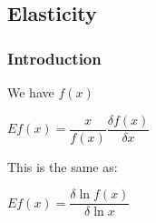 
\subsection{Elasticity}

\subsubsection{Introduction}

We have \(f(x)\)

\(Ef(x)=\dfrac{x}{f(x)}\dfrac{\delta f(x)}{\delta x}\)

This is the same as:

\(Ef(x)=\dfrac{\delta \ln f(x)}{\delta \ln x}\)

